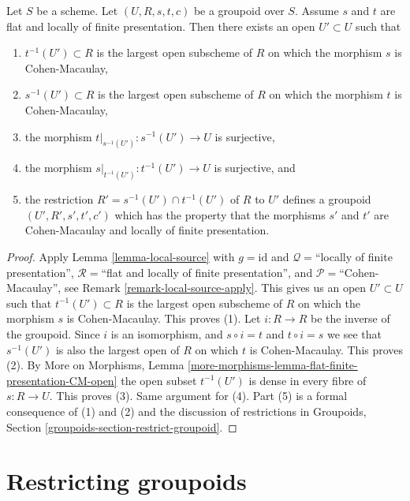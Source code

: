 \begin{lemma}
\label{lemma-make-CM}
Let $S$ be a scheme.
Let $(U, R, s, t, c)$ be a groupoid over $S$.
Assume $s$ and $t$ are flat and locally of finite presentation.
Then there exists an open $U' \subset U$ such that
\begin{enumerate}
\item $t^{-1}(U') \subset R$ is the largest open subscheme of
$R$ on which the morphism $s$ is Cohen-Macaulay,
\item $s^{-1}(U') \subset R$ is the largest open subscheme of
$R$ on which the morphism $t$ is Cohen-Macaulay,
\item the morphism $t|_{s^{-1}(U')} : s^{-1}(U') \to U$ is
surjective,
\item the morphism $s|_{t^{-1}(U')} : t^{-1}(U') \to U$ is
surjective, and
\item the restriction $R' = s^{-1}(U') \cap t^{-1}(U')$
of $R$ to $U'$ defines a groupoid $(U', R', s', t', c')$ which has the property
that the morphisms $s'$ and $t'$ are Cohen-Macaulay and locally of
finite presentation.
\end{enumerate}
\end{lemma}

\begin{proof}
Apply
Lemma \ref{lemma-local-source}
with
$g = \text{id}$ and
$\mathcal{Q} =$``locally of finite presentation'',
$\mathcal{R} =$``flat and locally of finite presentation'', and
$\mathcal{P}=$``Cohen-Macaulay'', see
Remark \ref{remark-local-source-apply}.
This gives us an open $U' \subset U$ such that
$t^{-1}(U') \subset R$ is the largest open subscheme of $R$
on which the morphism $s$ is Cohen-Macaulay.
This proves (1).
Let $i : R \to R$ be the inverse of the groupoid.
Since $i$ is an isomorphism, and $s \circ i = t$ and $t \circ i = s$
we see that $s^{-1}(U')$ is also the largest open of $R$ on which $t$ is
Cohen-Macaulay. This proves (2).
By
More on Morphisms,
Lemma \ref{more-morphisms-lemma-flat-finite-presentation-CM-open}
the open subset $t^{-1}(U')$ is dense in every fibre of $s : R \to U$.
This proves (3). Same argument for (4).
Part (5) is a formal consequence of (1) and (2) and the discussion
of restrictions in
Groupoids, Section \ref{groupoids-section-restrict-groupoid}.
\end{proof}








\section{Restricting groupoids}
\label{section-restricting-groupoids}

